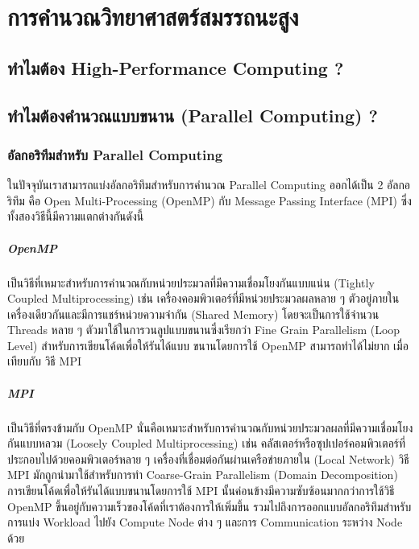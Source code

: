 

\chapter{การคำนวณวิทยาศาสตร์สมรรถนะสูง}
\label{ch:high_perf_comp}

\section{ทำไมต้อง High-Performance Computing ?}

\section{ทำไมต้องคำนวณแบบขนาน (Parallel Computing) ?}

\subsection{อัลกอริทึมสำหรับ Parallel Computing}

ในปัจจุบันเราสามารถแบ่งอัลกอริทึมสำหรับการคำนวณ Parallel Computing ออกได้เป็น 2 อัลกอริทึม คือ Open Multi-Processing (OpenMP)
กับ Message Passing Interface (MPI) ซึ่งทั้งสองวิธีนี้มีความแตกต่างกันดังนี้

\paragraph{OpenMP}
เป็นวิธีที่เหมาะสำหรับการคำนวณกับหน่วยประมวลที่มีความเชื่อมโยงกันแบบแน่น (Tightly Coupled Multiprocessing) เช่น
เครื่องคอมพิวเตอร์ที่มีหน่วยประมวลผลหลาย ๆ ตัวอยู่ภายในเครื่องเดียวกันและมีการแชร์หน่วยความจำกัน (Shared Memory) โดยจะเป็นการใช้จำนวน
Threads หลาย ๆ ตัวมาใช้ในการวนลูปแบบขนานซึ่งเรียกว่า Fine Grain Parallelism (Loop Level) สำหรับการเขียนโค้ดเพื่อให้รันได้แบบ%
ขนานโดยการใช้ OpenMP สามารถทำได้ไม่ยาก เมื่อเทียบกับ วิธี MPI

\paragraph{MPI}
เป็นวิธีที่ตรงข้ามกับ OpenMP นั่นคือเหมาะสำหรับการคำนวณกับหน่วยประมวลผลที่มีความเชื่อมโยงกันแบบหลวม (Loosely Coupled Multiprocessing)
เช่น คลัสเตอร์หรือซุปเปอร์คอมพิวเตอร์ที่ประกอบไปด้วยคอมพิวเตอร์หลาย ๆ เครื่องที่เชื่อมต่อกันผ่านเครือข่ายภายใน (Local Network) วิธี MPI
มักถูกนำมาใช้สำหรับการทำ Coarse-Grain Parallelism (Domain Decomposition) การเขียนโค้ดเพื่อให้รันได้แบบขนานโดยการใช้ MPI
นั้นค่อนข้างมีความซับซ้อนมากกว่าการใช้วิธี OpenMP ขึ้นอยู่กับความเร็วของโค้ดที่เราต้องการให้เพิ่มขึ้น รวมไปถึงการออกแบบอัลกอริทึมสำหรับการแบ่ง
Workload ไปยัง Compute Node ต่าง ๆ และการ Communication ระหว่าง Node ด้วย

